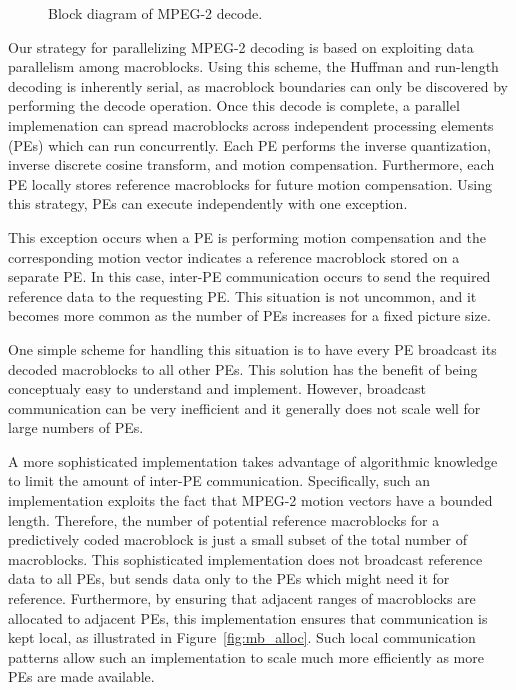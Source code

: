 \begin{figure}[htbp]
\centerline{}
\caption{Block diagram of MPEG-2 decode.}
\label{fig:dec_block}
\end{figure}

Our strategy for parallelizing MPEG-2 decoding is based on exploiting
data parallelism among macroblocks.  Using this scheme, the Huffman
and run-length decoding is inherently serial, as macroblock boundaries
can only be discovered by performing the decode operation.  Once this
decode is complete, a parallel implemenation can spread macroblocks
across independent processing elements (PEs) which can run
concurrently.  Each PE performs the inverse quantization, inverse
discrete cosine transform, and motion compensation.  Furthermore, each
PE locally stores reference macroblocks for future motion
compensation.  Using this strategy, PEs can execute independently with
one exception.

This exception occurs when a PE is performing motion compensation and
the corresponding motion vector indicates a reference macroblock
stored on a separate PE.  In this case, inter-PE communication occurs
to send the required reference data to the requesting PE.  This
situation is not uncommon, and it becomes more common as the number of
PEs increases for a fixed picture size.

One simple scheme for handling this situation is to have every PE
broadcast its decoded macroblocks to all other PEs.  This solution has
the benefit of being conceptualy easy to understand and implement.
However, broadcast communication can be very inefficient and it
generally does not scale well for large numbers of PEs.

A more sophisticated implementation takes advantage of algorithmic
knowledge to limit the amount of inter-PE communication.
Specifically, such an implementation exploits the fact
that MPEG-2 motion vectors have a bounded length.  Therefore, the
number of potential reference macroblocks for a predictively coded
macroblock is just a small subset of the total number of macroblocks.
This sophisticated implementation does not broadcast reference data to
all PEs, but sends data only to the PEs which might need it for
reference.  Furthermore, by ensuring that adjacent ranges of
macroblocks are allocated to adjacent PEs, this implementation ensures
that communication is kept local, as illustrated in
Figure~\ref{fig:mb_alloc}.  Such local communication patterns allow
such an implementation to scale much more efficiently as more PEs are
made available.

